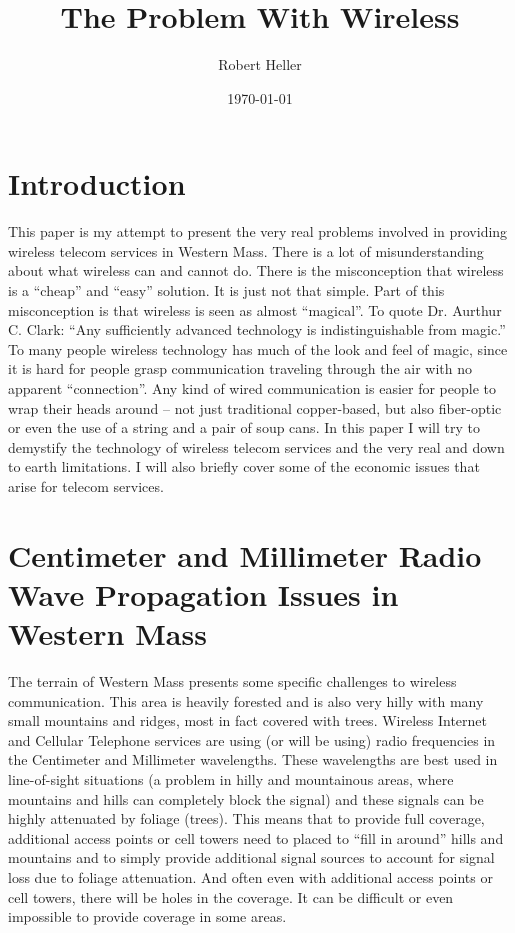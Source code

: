 \documentclass[12pt]{article}
\title{The Problem With Wireless}
\author{Robert Heller}
\date{\today}
\begin{document}
\maketitle

\tableofcontents


\section{Introduction}

This paper is my attempt to present the very real problems involved in
providing wireless telecom services in Western Mass. There is a lot of
misunderstanding about what wireless can and cannot do. There is the
misconception that wireless is a ``cheap'' and ``easy'' solution. It is just
not that simple. Part of this misconception is that wireless is seen as almost
``magical''. To quote Dr. Aurthur C. Clark: ``Any sufficiently advanced
technology is indistinguishable from magic.'' To many people wireless
technology has much of the look and feel of magic, since it is hard for people
grasp communication traveling through the air with no apparent ``connection''.
Any kind of wired communication is easier for people to wrap their heads
around -- not just traditional copper-based, but also fiber-optic or even the
use of a string and a pair of soup cans. In this paper I will try to demystify
the technology of wireless telecom services and the very real and down to
earth limitations. I will also briefly cover some of the economic issues that
arise for telecom services.


\section{Centimeter and Millimeter Radio Wave Propagation Issues in Western Mass}

The terrain of Western Mass presents some specific challenges to wireless
communication. This area is heavily forested and is also very hilly with many
small mountains and ridges, most in fact covered with trees. Wireless Internet
and Cellular Telephone services are using (or will be using) radio frequencies
in the Centimeter and Millimeter wavelengths. These wavelengths are best used
in line-of-sight situations (a problem in hilly and mountainous areas, where
mountains and hills can completely block the signal) and these signals can be
highly attenuated by foliage (trees)\cite{Effect.IJCA.0975-8887}. This means
that to provide full coverage, additional access points or cell towers need to
placed to ``fill in around'' hills and mountains and to simply provide
additional signal sources to account for signal loss due to foliage
attenuation. And often even with additional access points or cell towers,
there will be holes in the coverage. It can be difficult or even impossible to
provide coverage in some areas.
\end{document}
